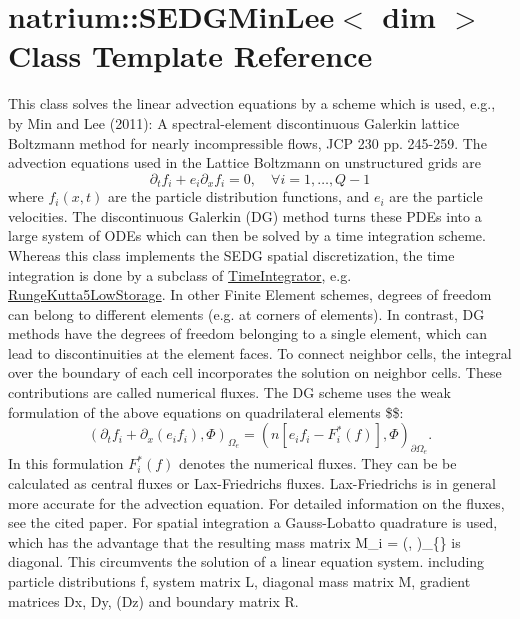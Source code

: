 \hypertarget{classnatrium_1_1SEDGMinLee}{\section{natrium\-:\-:S\-E\-D\-G\-Min\-Lee$<$ dim $>$ Class Template Reference}
\label{classnatrium_1_1SEDGMinLee}
}


This class solves the linear advection equations by a scheme which is used, e.\-g., by Min and Lee (2011)\-: A spectral-\/element discontinuous Galerkin lattice Boltzmann method for nearly incompressible flows, J\-C\-P 230 pp. 245-\/259. The advection equations used in the Lattice Boltzmann on unstructured grids are \[ \partial_t f_i + e_i \partial_x f_i = 0,\quad \forall i = 1,\dots,Q-1 \] where $ f_i(x,t) $ are the particle distribution functions, and $ e_i $ are the particle velocities. The discontinuous Galerkin (D\-G) method turns these P\-D\-Es into a large system of O\-D\-Es which can then be solved by a time integration scheme. Whereas this class implements the S\-E\-D\-G spatial discretization, the time integration is done by a subclass of \hyperlink{classnatrium_1_1TimeIntegrator}{Time\-Integrator}, e.\-g. \hyperlink{classnatrium_1_1RungeKutta5LowStorage}{Runge\-Kutta5\-Low\-Storage}. In other Finite Element schemes, degrees of freedom can belong to different elements (e.\-g. at corners of elements). In contrast, D\-G methods have the degrees of freedom belonging to a single element, which can lead to discontinuities at the element faces. To connect neighbor cells, the integral over the boundary of each cell incorporates the solution on neighbor cells. These contributions are called numerical fluxes. The D\-G scheme uses the weak formulation of the above equations on quadrilateral elements \$\$\-: \[ \left( \partial_t f_i + \partial_x (e_i f_i), \Phi \right)_{\Omega_e} = \left(n \left[ e_i f_i - F^{\ast}_{i}(f) \right], \Phi \right)_{\partial \Omega_e}. \] In this formulation $ F^{\ast}_{i}(f) $ denotes the numerical fluxes. They can be be calculated as central fluxes or Lax-\/\-Friedrichs fluxes. Lax-\/\-Friedrichs is in general more accurate for the advection equation. For detailed information on the fluxes, see the cited paper. For spatial integration a Gauss-\/\-Lobatto quadrature is used, which has the advantage that the resulting mass matrix M\-\_\-i = (, )\-\_\-\{\} is diagonal. This circumvents the solution of a linear equation system. including particle distributions f, system matrix L, diagonal mass matrix M, gradient matrices Dx, Dy, (Dz) and boundary matrix R.  




